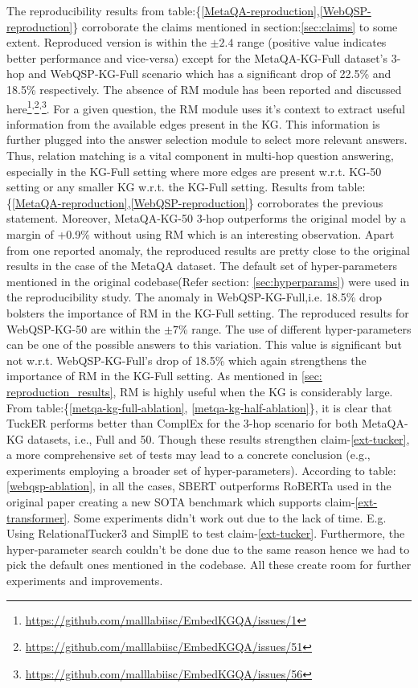 The reproducibility results from table:\{\ref{MetaQA-reproduction},\ref{WebQSP-reproduction}\} corroborate the claims mentioned in section:\ref{sec:claims} to some extent.  Reproduced version is within the $\pm 2.4$ range (positive value indicates better performance and vice-versa) except for the MetaQA-KG-Full dataset's 3-hop and WebQSP-KG-Full scenario which has a significant drop of 22.5\% and 18.5\% respectively. The absence of RM module has been reported and discussed here\footnote{\url{https://github.com/malllabiisc/EmbedKGQA/issues/1}}\textsuperscript{,}\footnote{\url{https://github.com/malllabiisc/EmbedKGQA/issues/51}}\textsuperscript{,}\footnote{\url{https://github.com/malllabiisc/EmbedKGQA/issues/56}}. For a given question, the RM module uses it's context to extract useful information from the available edges present in the KG. This information is further plugged into the answer selection module to select more relevant answers. Thus, relation matching is a vital component in multi-hop question answering, especially in the KG-Full setting where more edges are present w.r.t. KG-50 setting or any smaller KG w.r.t. the KG-Full setting. Results from table:\{\ref{MetaQA-reproduction},\ref{WebQSP-reproduction}\} corroborates the previous statement. Moreover, MetaQA-KG-50 3-hop outperforms the original model by a margin of +0.9\% without using RM which is an interesting observation. Apart from one reported anomaly, the reproduced results are pretty close to the original results in the case of the MetaQA dataset. The default set of hyper-parameters mentioned in the original codebase(Refer section: \ref{sec:hyperparams}) were used in the reproducibility study. The anomaly in WebQSP-KG-Full,i.e. 18.5\% drop bolsters the importance of RM in the KG-Full setting. The reproduced results for WebQSP-KG-50 are within the $\pm7$\% range. The use of different hyper-parameters can be one of the possible answers to this variation. This value is significant but not w.r.t. WebQSP-KG-Full's drop of 18.5\% which again strengthens the importance of RM in the KG-Full setting. As mentioned in \ref{sec: reproduction_results}, RM is highly useful when the KG is considerably large. From table:\{\ref{metqa-kg-full-ablation}, \ref{metqa-kg-half-ablation}\}, it is clear that 
TuckER \cite{tucker2019} performs better than ComplEx \cite{ComplEx2016} for the 3-hop scenario for both MetaQA-KG datasets, i.e., Full and 50. Though these results strengthen claim-\ref{ext-tucker}, a more comprehensive set of tests may lead to a concrete conclusion (e.g., experiments employing a broader set of hyper-parameters). According to table:\ref{webqsp-ablation}, in all the cases, SBERT \cite{reimers-2019-sentence-bert} outperforms RoBERTa \cite{roberta} used in the original paper creating a new SOTA benchmark which supports claim-\ref{ext-transformer}. Some experiments didn't work out due to the lack of time. E.g. Using RelationalTucker3 \cite{wang2019relational} and SimplE \cite{simple-embedding} to test claim-\ref{ext-tucker}. Furthermore, the hyper-parameter search couldn't be done due to the same reason hence we had to pick the default ones mentioned in the codebase. All these create room for further experiments and improvements.

